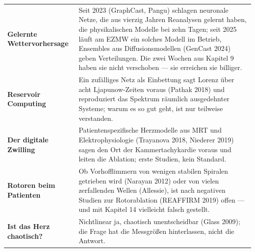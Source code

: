 \begin{merksatz}
\begin{center}
{\small
\renewcommand{\arraystretch}{1.5}
\begin{tabular}{@{}P{3.2cm}P{5.4cm}@{}}
\toprule
\textbf{Gelernte Wettervorhersage} & Seit 2023 (GraphCast, Pangu) schlagen neuronale Netze, die aus vierzig Jahren Reanalysen gelernt haben, die physikalischen Modelle bei zehn Tagen; seit 2025 läuft am EZMW ein solches Modell im Betrieb, Ensembles aus Diffusionsmodellen (GenCast 2024) geben Verteilungen. Die zwei Wochen aus Kapitel 9 haben sie nicht verschoben --- sie erreichen sie billiger.\\
\textbf{Reservoir Computing} & Ein zufälliges Netz als Einbettung sagt Lorenz über acht Ljapunow-Zeiten voraus (Pathak 2018) und reproduziert das Spektrum räumlich ausgedehnter Systeme; warum es so gut geht, ist nur teilweise verstanden.\\
\textbf{Der digitale Zwilling} & Patientenspezifische Herzmodelle aus MRT und Elektrophysiologie (Trayanova 2018, Niederer 2019) sagen den Ort der Kammertachykardie voraus und leiten die Ablation; erste Studien, kein Standard.\\
\textbf{Rotoren beim Patienten} & Ob Vorhofflimmern von wenigen stabilen Spiralen getrieben wird (Narayan 2012) oder von vielen zerfallenden Wellen (Allessie), ist nach negativen Studien zur Rotorablation (REAFFIRM 2019) offen --- und mit Kapitel 14 vielleicht falsch gestellt.\\
\textbf{Ist das Herz chaotisch?} & Nichtlinear ja, chaotisch unentscheidbar (Glass 2009); die Frage hat die Messgrößen hinterlassen, nicht die Antwort.\\
\bottomrule
\end{tabular}}
\end{center}

\begin{center}
\begin{minipage}{0.88\textwidth}
\end{minipage}
\end{center}
\end{merksatz}

